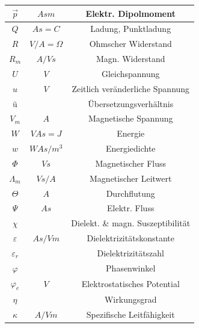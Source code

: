 \documentclass[a4paper, 6pt, landscape]{scrartcl}
\begin{document}
\begin{multicols*}{4}
\begin{tabular}{|c|c|c|}
		\hline
		$\vec{p}$       & $Asm$            & Elektr. Dipolmoment                \\
		\hline
		$Q$             & $As=C$           & Ladung, Punktladung                \\
		\hline
		$R$             & $V/A=\Omega$     & Ohmscher Widerstand                \\
		\hline
		$R_m$           & $A/Vs$           & Magn. Widerstand                   \\
		\hline
		$U$             & $V$              & Gleichspannung                     \\
		\hline
		$u$             & $V$              & Zeitlich veränderliche Spannung   \\
		\hline
		ü              &                  & Übersetzungsverhältnis           \\
		\hline
		$V_m$           & $A$              & Magnetische Spannung               \\
		\hline
		$W$             & $VAs=J$          & Energie                            \\
		\hline
		$w$             & $WAs/m^3$        & Energiedichte                      \\
		\hline
		$\Phi$          & $Vs$             & Magnetischer Fluss                 \\
		\hline
		$\Lambda_m$     & $Vs/A$           & Magnetischer Leitwert              \\
		\hline
		$\Theta$        & $A$              & Durchflutung                       \\
		\hline
		$\Psi$          & $As$             & Elektr. Fluss                      \\
		\hline
		$\chi$          &                  & Dielekt. \& magn. Suszeptibilität \\
		\hline
		$\varepsilon$   & $As/Vm$          & Dielektrizitätskonstante          \\
		\hline
		$\varepsilon_r$ &                  & Dielektrizitätszahl               \\
		\hline
		$\varphi$       &                  & Phasenwinkel                       \\
		\hline
		$\varphi_e$     & $V$              & Elektrostatisches Potential        \\
		\hline
		$\eta$          &                  & Wirkungsgrad                       \\
		\hline
		$\kappa$        & $A/Vm$           & Spezifische Leitfähigkeit         \\

\end{tabular}
\end{multicols*}
\end{document}
